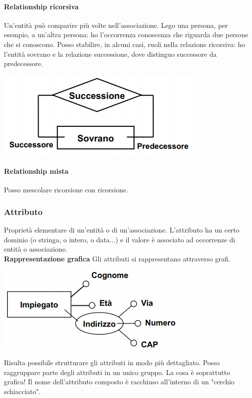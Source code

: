 \paragraph{Relationship ricorsiva} Un'entità può comparire più volte nell'associazione. Lego una persona, per esempio, a un'altra persona: ho l'occorrenza conoscenza che riguarda due persone che si conoscono. Posso stabilire, in alcuni casi, ruoli nella relazione ricorsiva: ho l'entità sovrano e la relazione successione, dove distinguo successore da predecessore.
\begin{center}\includegraphics{images/11.PNG}\end{center}
\paragraph{Relationship mista} Posso mescolare ricorsione con ricorsione.

\subsubsection{Attributo}
Proprietà elementare di un'entità o di un'associazione.  L'attributo ha un certo dominio (o stringa, o intero, o data...) e il valore è associato ad occorrenze di entità o associazione.\\

\noindent \textbf{Rappresentazione grafica} Gli attributi si rappresentano attraverso grafi.
\begin{center}\includegraphics{images/12.PNG}\end{center}
Risulta possibile strutturare gli attributi in modo più dettagliato. Posso raggruppare parte degli attributi in un unico gruppo. La cosa è soprattutto grafica! Il nome dell'attributo composto è racchiuso all'interno di un "cerchio schiacciato".

